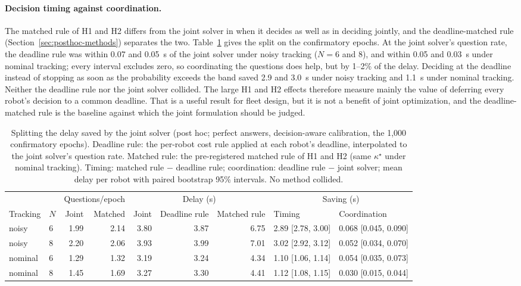 \documentclass[a4paper,fleqn]{cas-dc}
\begin{document}
\paragraph{Decision timing against coordination.} The matched rule of H1 and H2 differs from the joint solver in when it decides as well as in deciding jointly, and the deadline-matched rule (Section~\ref{sec:posthoc-methods}) separates the two. Table~\ref{tab:decomp} gives the split on the confirmatory epochs. At the joint solver's question rate, the deadline rule was within 0.07 and \SI{0.05}{s} of the joint solver under noisy tracking ($N = 6$ and 8), and within 0.05 and \SI{0.03}{s} under nominal tracking; every interval excludes zero, so coordinating the questions does help, but by 1--2\% of the delay. Deciding at the deadline instead of stopping as soon as the probability exceeds the band saved 2.9 and \SI{3.0}{s} under noisy tracking and \SI{1.1}{s} under nominal tracking. Neither the deadline rule nor the joint solver collided. The large H1 and H2 effects therefore measure mainly the value of deferring every robot's decision to a common deadline. That is a useful result for fleet design, but it is not a benefit of joint optimization, and the deadline-matched rule is the baseline against which the joint formulation should be judged.

\begin{table}
\centering
\caption{Splitting the delay saved by the joint solver (post hoc; perfect answers, decision-aware calibration, the 1{,}000 confirmatory epochs). Deadline rule: the per-robot cost rule applied at each robot's deadline, interpolated to the joint solver's question rate. Matched rule: the pre-registered matched rule of H1 and H2 (same $\kappa^\star$ under nominal tracking). Timing: matched rule $-$ deadline rule; coordination: deadline rule $-$ joint solver; mean delay per robot with paired bootstrap 95\% intervals. No method collided.}
\label{tab:decomp}
\begin{tabular*}{\textwidth}{@{\extracolsep{\fill}}llrrrrrll}
\toprule
 & & \multicolumn{2}{c}{Questions/epoch} & \multicolumn{3}{c}{Delay (s)} & \multicolumn{2}{c}{Saving (s)} \\
\cmidrule(lr){3-4}\cmidrule(lr){5-7}\cmidrule(lr){8-9}
Tracking & $N$ & Joint & Matched & Joint & Deadline rule & Matched rule & Timing & Coordination \\
\midrule

noisy & 6 & 1.99 & 2.14 & 3.80 & 3.87 & 6.75 & 2.89 [2.78, 3.00] & 0.068 [0.045, 0.090] \\
noisy & 8 & 2.20 & 2.06 & 3.93 & 3.99 & 7.01 & 3.02 [2.92, 3.12] & 0.052 [0.034, 0.070] \\
nominal & 6 & 1.29 & 1.32 & 3.19 & 3.24 & 4.34 & 1.10 [1.06, 1.14] & 0.054 [0.035, 0.073] \\
nominal & 8 & 1.45 & 1.69 & 3.27 & 3.30 & 4.41 & 1.12 [1.08, 1.15] & 0.030 [0.015, 0.044] \\
\bottomrule
\end{tabular*}
\end{table}
\end{document}

